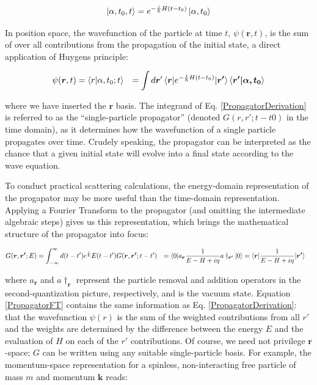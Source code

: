 \begin{equation}
    \ket{\alpha, t_{0}, t} = e^{-\frac{i}{\hbar}H(t-t_{0})}\ket{\alpha, t_{0}}
\end{equation}

In position space, the wavefunction of the particle at time $t$, $\psi(\bm{r},t)$,
is the sum of over all contributions from the propagation of the initial state, a direct application of
Huygens principle:

\begin{equation} \label{PropagatorDerivation}
    \begin{split}
        \psi(\bm{r},t) & = \braket{r|\alpha, t_{0}; t}
        & = \int d\bm{r}'
        \braket{\bm{r}|e^{-\frac{i}{\hbar}H(t-t_{0})}|\bm{r'}}\braket{\bm{r'|\alpha,t_{0}}}
    \end{split}
\end{equation}

\noindent
where we have inserted the $\bm{r}$ basis.
The integrand of Eq. \ref{PropagatorDerivation} is referred to as the ``single-particle propagator'' (denoted $G(r,
r'; t-t0)$ in the time domain), as it determines how the wavefunction of a single particle
propagates over time. Crudely speaking, the propagator can be interpreted as the chance that a given
initial state will evolve into a final state according to the wave equation.

To conduct practical scattering calculations, the energy-domain representation of the progapator
may be more useful than the time-domain representation. Applying a Fourier Transform to the propagator
(and omitting the intermediate algebraic steps) gives us this representation, which brings the mathematical
structure of the propagator into focus:

\begin{equation} \label{PropagatorFT}
    \begin{split}
        G(\bm{r},\bm{r'};E) & = \int_{-\infty}^{\infty}d(t-t')e^\frac{i}{\hbar}E(t-t')G(\bm{r},\bm{r'}; t-t')
        & = \braket{0|a_{\bm{r}}\frac{1}{E-H+i\eta}a\dagger_{\bm{r'}}|0}
        & = \braket{\bm{r} | \frac{1}{E-H+i\eta} | \bm{r'}}
    \end{split}
\end{equation}

\noindent
where $a_{\bm{r}}$ and $a\dagger_{\bm{r}}$ represent the particle removal and addition operators in
the second-quantization picture, respectively, and  is the vacuum state.
Equation \ref{PropagatorFT} contains the same information as Eq. \ref{PropagatorDerivation}: that
the wavefunction $\psi(r)$ is the sum of the weighted contributions from all $r'$ and the weights
are determined by the difference between the energy $E$ and the evaluation of $H$ on each of the $r'$
contributions. Of course, we need not privilege $\bm{r}$-space; $G$ can be written using any
suitable single-particle basis. For example, the momentum-space representation for a spinless,
non-interacting free particle of mass $m$ and momentum $\bm{k}$ reads:

